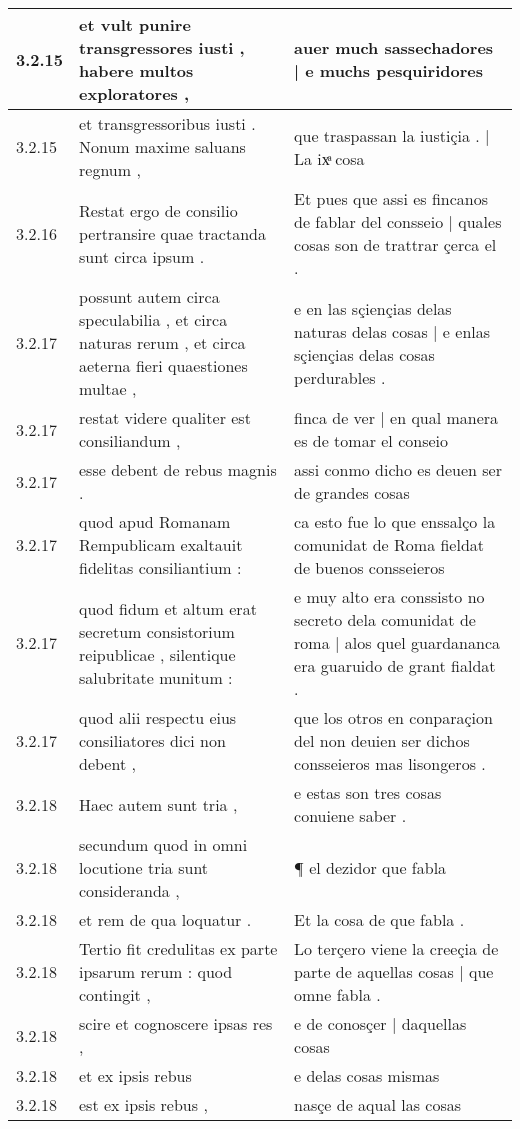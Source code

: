 \begin{tabular}{|p{1cm}|p{6.5cm}|p{6.5cm}|}
3.2.15 & et vult punire transgressores iusti , habere multos exploratores , & auer much sassechadores | e muchs pesquiridores \\\hline
3.2.15 & et transgressoribus iusti . Nonum maxime saluans regnum , & que traspassan la iustiçia . | La ixͣ cosa \\\hline
3.2.16 & Restat ergo de consilio pertransire quae tractanda sunt circa ipsum . & Et pues que assi es fincanos de fablar del consseio | quales cosas son de trattrar çerca el . \\\hline
3.2.17 & possunt autem circa speculabilia , et circa naturas rerum , et circa aeterna fieri quaestiones multae , & e en las sçiençias delas naturas delas cosas | e enlas sçiençias delas cosas perdurables . \\\hline
3.2.17 & restat videre qualiter est consiliandum , & finca de ver | en qual manera es de tomar el conseio \\\hline
3.2.17 & esse debent de rebus magnis . & assi conmo dicho es deuen ser de grandes cosas \\\hline
3.2.17 & quod apud Romanam Rempublicam exaltauit fidelitas consiliantium : & ca esto fue lo que enssalço la comunidat de Roma fieldat de buenos consseieros \\\hline
3.2.17 & quod fidum et altum erat secretum consistorium reipublicae , silentique salubritate munitum : & e muy alto era conssisto no secreto dela comunidat de roma | alos quel guardananca era guaruido de grant fialdat . \\\hline
3.2.17 & quod alii respectu eius consiliatores dici non debent , & que los otros en conparaçion del non deuien ser dichos consseieros mas lisongeros . \\\hline
3.2.18 & Haec autem sunt tria , & e estas son tres cosas conuiene saber . \\\hline
3.2.18 & secundum quod in omni locutione tria sunt consideranda , & ¶ el dezidor que fabla \\\hline
3.2.18 & et rem de qua loquatur . & Et la cosa de que fabla . \\\hline
3.2.18 & Tertio fit credulitas ex parte ipsarum rerum : quod contingit , & Lo terçero viene la creeçia de parte de aquellas cosas | que omne fabla . \\\hline
3.2.18 & scire et cognoscere ipsas res , & e de conosçer | daquellas cosas \\\hline
3.2.18 & et ex ipsis rebus & e delas cosas mismas \\\hline
3.2.18 & est ex ipsis rebus , & nasçe de aqual las cosas \\\hline

\end{tabular}

